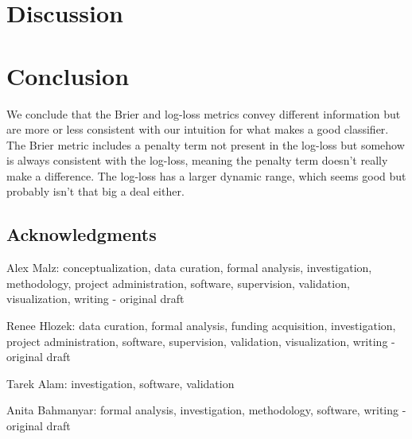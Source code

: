 \documentclass[\docopts]{\docclass}
\begin{document}
\section{Discussion}
\label{sec:discussion}




\section{Conclusion}
\label{sec:conclusion}

We conclude that the Brier and log-loss metrics convey different information but are more or less consistent with our intuition for what makes a good classifier. The Brier metric includes a penalty term not present in the log-loss but somehow is always consistent with the log-loss, meaning the penalty term doesn't really make a difference. The log-loss has a larger dynamic range, which seems good but probably isn't that big a deal either.


\subsection*{Acknowledgments}




Alex Malz: conceptualization, data curation, formal analysis, investigation, methodology, project administration, software, supervision, validation, visualization, writing - original draft

Renee Hlozek: data curation, formal analysis, funding acquisition, investigation, project administration, software, supervision, validation, visualization, writing - original draft

Tarek Alam: investigation, software, validation

Anita Bahmanyar: formal analysis, investigation, methodology, software, writing - original draft
\end{document}
